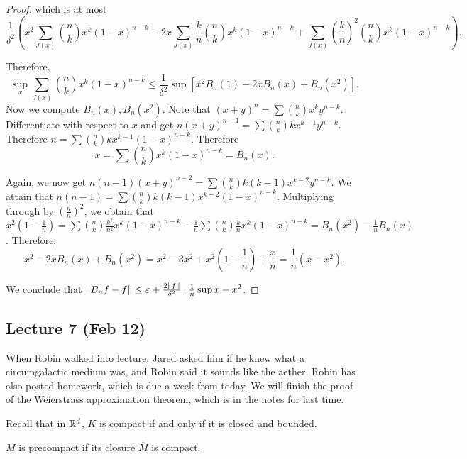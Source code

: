 \documentclass[10pt, twoside]{article}
\begin{document}
\begin{thm}
\begin{proof}
            which is at most \[\frac{1}{\delta^2} \left( x^2 \sum_{J(x)}
            \binom{n}{k}x^k(1-x)^{n-k} - 2x \sum_{J(x)} \frac{k}{n}
    \binom{n}{k}x^k(1-x)^{n-k} + \sum_{J(x)} \left( \frac{k}{n} \right)^2
    \binom{n}{k}x^k(1-x)^{n-k} \right).\]
            
            Therefore, \[ \sup_x \sum_{J(x)} \binom{n}{k}x^k(1-x)^{n-k} \leq
                \frac{1}{\delta^2} \sup \left[ x^2 B_n(1) - 2x B_n(x) +
                B_n(x^2) \right]. \] Now we compute $B_n(x), B_n(x^2)$.  Note
                that $(x+y)^n = \sum \binom{n}{k} x^k y^{n-k}$. Differentiate
                with respect to $x$ and get $n(x+y)^{n-1} = \sum
                \binom{n}{k}kx^{k-1}y^{n-k}$. Therefore $n = \sum
                \binom{n}{k}kx^{k-1}(1-x)^{n-k}$. Therefore \[x = \sum
                \binom{n}{k}x^k(1-x)^{n-k} = B_n(x).\]

            Again, we now get $n(n-1)(x+y)^{n-2} = \sum
            \binom{n}{k}k(k-1)x^{k-2}y^{n-k}$. We attain that $n(n-1) = \sum
            \binom{n}{k}k(k-1)x^{k-2}(1-x)^{n-k}$. Multiplying through by
            $\left(\frac{n}{n}\right)^2$, we obtain that
            $x^2\left(1-\frac{1}{n}\right) = \sum \binom{n}{k}
            \frac{k^2}{n^2}x^k(1-x)^{n-k} - \frac{1}{n}\sum
            \binom{n}{k}\frac{k}{n}x^k(1-x)^{n-k} = B_n(x^2) -
            \frac{1}{n}B_n(x)$. Therefore, \[x^2-2xB_n(x)+B_n(x^2) = x^2-3x^2 +
            x^2 \left(1 - \frac{1}{n}\right) + \frac{x}{n} =
        \frac{1}{n}(x-x^2).\]

            We conclude that $\lVert B_nf - f\rVert \leq \varepsilon + \frac{2
        \lVert f\rVert}{\delta^2} \cdot \frac{1}{n} \sup{x-x^2}$.  \end{proof}
    \end{thm}

    \subsection*{Lecture 7 (Feb 12)} When Robin walked into lecture, Jared
    asked him if he knew what a circumgalactic medium was, and Robin said it
    sounds like the aether. Robin has also posted homework, which is due a week
    from today. We will finish the proof of the Weierstrass approximation
    theorem, which is in the notes for last time.

    Recall that in $\mathbb{R}^d$, $K$ is compact if and only if it is closed and
    bounded.

    \begin{defn}[Precompact] $M$ is precompact if its closure $\overline{M}$ is
    compact.  \end{defn}
\end{document}
